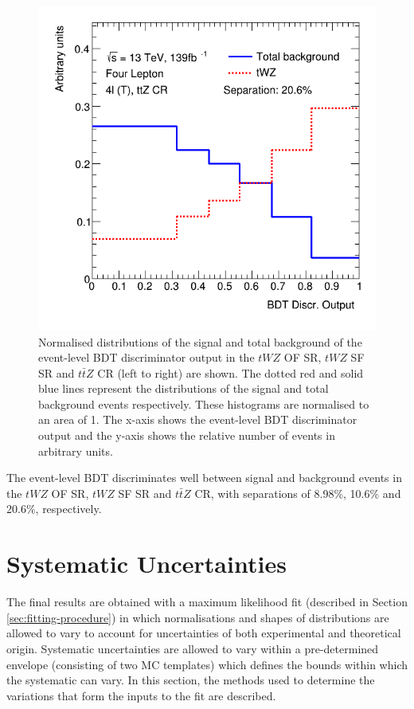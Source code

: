 \begin{figure}[h!]
	\includegraphics[scale=0.27]{figures/lep4_ttZ_4T.png}
	\centering
	\caption{Normalised distributions of the signal and total background of the event-level BDT discriminator output in the $tWZ$ OF SR, $tWZ$ SF SR and $t\bar{t}Z$ CR (left to right) are shown. The dotted red and solid blue lines represent the distributions of the signal and total background events respectively. These histograms are normalised to an area of 1. The x-axis shows the event-level BDT discriminator output and the y-axis shows the relative number of events in arbitrary units.}
	\label{fig:2vsm-normdists}
\end{figure}The event-level BDT discriminates well between signal and background events in the $tWZ$ OF SR, $tWZ$ SF SR and $t\bar{t}Z$ CR, with separations of 8.98$\%$, 10.6$\%$ and 20.6$\%$, respectively.

\section{Systematic Uncertainties}
\label{sec:systematics}
The final results are obtained with a maximum likelihood fit (described in Section \ref{sec:fitting-procedure}) in which normalisations and shapes of distributions are allowed to vary to account for uncertainties of both experimental and theoretical origin. Systematic uncertainties are allowed to vary within a pre-determined envelope (consisting of two MC templates) which defines the bounds within which the systematic can vary. In this section, the methods used to determine the variations that form the inputs to the fit are described.

